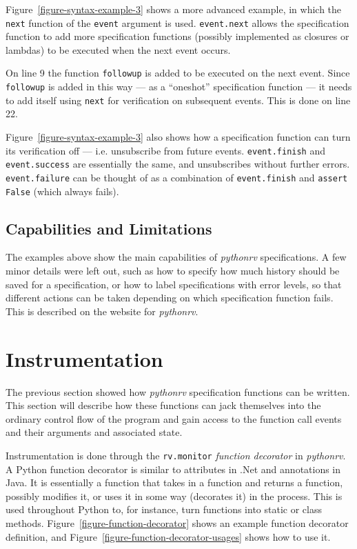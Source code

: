 \documentclass[a4paper,11pt]{kth-mag}
\begin{document}
Figure~\ref{figure-syntax-example-3} shows a more advanced example, in which
the \texttt{next} function of the \texttt{event} argument is used.
\texttt{event.next} allows the specification function to add more specification
functions (possibly implemented as closures or lambdas) to be executed when the
next event occurs.

On line 9 the function \texttt{followup} is added to be executed on the next
event. Since \texttt{followup} is added in this way --- as a ``oneshot''
specification function --- it needs to add itself using \texttt{next} for
verification on subsequent events. This is done on line 22.

Figure~\ref{figure-syntax-example-3} also shows how a specification function
can turn its verification off --- i.e. unsubscribe from future events.
\texttt{event.finish} and \texttt{event.success} are essentially the same, and
unsubscribes without further errors. \texttt{event.failure} can be thought of
as a combination of \texttt{event.finish} and \texttt{assert False} (which
always fails).


\subsection{Capabilities and Limitations}

The examples above show the main capabilities of \textit{pythonrv}
specifications. A few minor details were left out, such as how to specify how
much history should be saved for a specification, or how to label
specifications with error levels, so that different actions can be taken
depending on which specification function fails. This is described on the website for
\textit{pythonrv}.


\section{Instrumentation} \label{section-approach-instrumentation}

The previous section showed how \textit{pythonrv} specification functions can
be written. This section will describe how these functions can jack themselves
into the ordinary control flow of the program and gain access to the function
call events and their arguments and associated state.

Instrumentation is done through the \texttt{rv.monitor} \textit{function
decorator} in \textit{pythonrv}. A Python function decorator is similar to
attributes in .Net and annotations in Java. It is essentially a function that
takes in a function and returns a function, possibly modifies it, or uses it in
some way (decorates it) in the process. This is used throughout Python to, for
instance, turn functions into static or class methods.
Figure~\ref{figure-function-decorator} shows an example function decorator
definition, and Figure~\ref{figure-function-decorator-usages} shows how to use
it.
\end{document}
